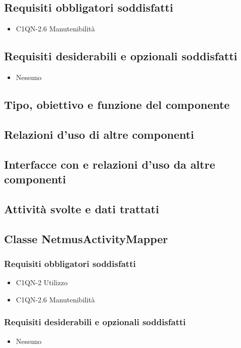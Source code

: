 \subsection*{Requisiti obbligatori soddisfatti}
\begin{itemize}
    \item C1QN-2.6 Manutenibilit\`a
\end{itemize}
\subsection*{Requisiti desiderabili e opzionali soddisfatti}
\begin{itemize}
    \item Nessuno
\end{itemize}
\subsection*{Tipo, obiettivo e funzione del componente}
\subsection*{Relazioni d'uso di altre componenti}
\subsection*{Interfacce con e relazioni d'uso da altre componenti}
\subsection*{Attivit\`a svolte e dati trattati}

\subsection{Classe NetmusActivityMapper}
\subsubsection*{Requisiti obbligatori soddisfatti}
\begin{itemize}
	\item C1QN-2 Utilizzo
	\item C1QN-2.6 Manutenibilit\`a
\end{itemize}
\subsubsection*{Requisiti desiderabili e opzionali soddisfatti}
\begin{itemize}
    \item Nessuno
\end{itemize}
